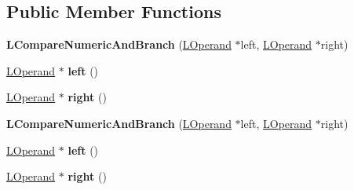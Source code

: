 \subsection*{Public Member Functions}
\begin{DoxyCompactItemize}
\item 
{\bfseries L\+Compare\+Numeric\+And\+Branch} (\hyperlink{classv8_1_1internal_1_1_l_operand}{L\+Operand} $\ast$left, \hyperlink{classv8_1_1internal_1_1_l_operand}{L\+Operand} $\ast$right)\hypertarget{classv8_1_1internal_1_1_l_compare_numeric_and_branch_a5afb3c2f289e4c7033d868e0aeddcab5}{}\label{classv8_1_1internal_1_1_l_compare_numeric_and_branch_a5afb3c2f289e4c7033d868e0aeddcab5}

\item 
\hyperlink{classv8_1_1internal_1_1_l_operand}{L\+Operand} $\ast$ {\bfseries left} ()\hypertarget{classv8_1_1internal_1_1_l_compare_numeric_and_branch_a79bb030dd9f03363161a5d94630b58b3}{}\label{classv8_1_1internal_1_1_l_compare_numeric_and_branch_a79bb030dd9f03363161a5d94630b58b3}

\item 
\hyperlink{classv8_1_1internal_1_1_l_operand}{L\+Operand} $\ast$ {\bfseries right} ()\hypertarget{classv8_1_1internal_1_1_l_compare_numeric_and_branch_a2b4de02706592a0cbc826ed12c8b2358}{}\label{classv8_1_1internal_1_1_l_compare_numeric_and_branch_a2b4de02706592a0cbc826ed12c8b2358}

\item 
{\bfseries L\+Compare\+Numeric\+And\+Branch} (\hyperlink{classv8_1_1internal_1_1_l_operand}{L\+Operand} $\ast$left, \hyperlink{classv8_1_1internal_1_1_l_operand}{L\+Operand} $\ast$right)\hypertarget{classv8_1_1internal_1_1_l_compare_numeric_and_branch_a5afb3c2f289e4c7033d868e0aeddcab5}{}\label{classv8_1_1internal_1_1_l_compare_numeric_and_branch_a5afb3c2f289e4c7033d868e0aeddcab5}

\item 
\hyperlink{classv8_1_1internal_1_1_l_operand}{L\+Operand} $\ast$ {\bfseries left} ()\hypertarget{classv8_1_1internal_1_1_l_compare_numeric_and_branch_a79bb030dd9f03363161a5d94630b58b3}{}\label{classv8_1_1internal_1_1_l_compare_numeric_and_branch_a79bb030dd9f03363161a5d94630b58b3}

\item 
\hyperlink{classv8_1_1internal_1_1_l_operand}{L\+Operand} $\ast$ {\bfseries right} ()\hypertarget{classv8_1_1internal_1_1_l_compare_numeric_and_branch_a2b4de02706592a0cbc826ed12c8b2358}{}\label{classv8_1_1internal_1_1_l_compare_numeric_and_branch_a2b4de02706592a0cbc826ed12c8b2358}


\end{DoxyCompactItemize}
